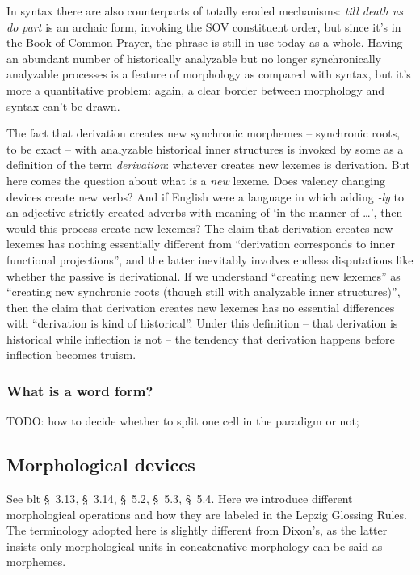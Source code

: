 \documentclass[UTF8, a4paper, oneside, scheme=plain]{ctexart}
\newcommand*{\citesec}[1]{\S~{#1}}
\newcommand*{\term}[1]{\emph{#1}}
\newcommand*{\corpus}[1]{\emph{#1}}
\newcommand*{\translate}[1]{`#1'}
\begin{document}
In syntax there are also counterparts of totally eroded mechanisms:
\corpus{till death us do part} is an archaic form,
invoking the SOV constituent order,
but since it's in the Book of Common Prayer,
the phrase is still in use today as a whole.
Having an abundant number of historically analyzable but no longer synchronically analyzable processes 
is a feature of morphology as compared with syntax,
but it's more a quantitative problem:
again, a clear border between morphology and syntax can't be drawn.

The fact that derivation creates new synchronic morphemes -- synchronic roots, to be exact
-- with analyzable historical inner structures 
is invoked by some as a definition of the term \term{derivation}:
whatever creates new lexemes is derivation.
But here comes the question about what is a \emph{new} lexeme.
Does valency changing devices create new verbs?
And if English were a language 
in which adding \corpus{-ly} to an adjective
strictly created adverbs with meaning of \translate{in the manner of \dots},
then would this process create new lexemes?
The claim that derivation creates new lexemes 
has nothing essentially different from 
``derivation corresponds to inner functional projections'',
and the latter inevitably involves endless disputations like whether the passive is derivational.
If we understand ``creating new lexemes'' 
as ``creating new synchronic roots (though still with analyzable inner structures)'',
then the claim that derivation creates new lexemes
has no essential differences with ``derivation is kind of historical''.
Under this definition -- 
that derivation is historical while inflection is not --
the tendency that derivation happens before inflection becomes truism.

\subsubsection{What is a word form?}

TODO: how to decide whether to split one cell in the paradigm or not;

\subsection{Morphological devices}

See \ac{blt} \citesec{3.13}, \citesec{3.14}, \citesec{5.2}, \citesec{5.3}, \citesec{5.4}.
Here we introduce different morphological operations and how they are labeled in the Lepzig Glossing Rules. 
The terminology adopted here is slightly different from Dixon's, 
as the latter insists only morphological units in concatenative morphology can be said as morphemes.
\end{document}

